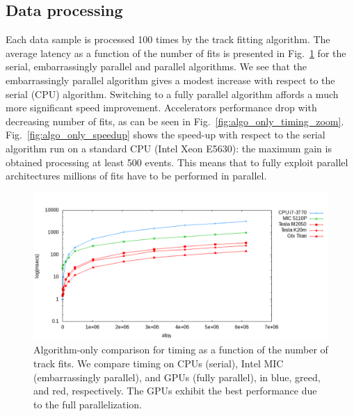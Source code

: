 \documentclass[a4]{jpconf}
\begin{document}
\subsection{Data processing}
Each data sample is processed 100 times by the track fitting algorithm. 
The average latency as a function of the number of fits is presented in 
Fig.~\ref{fig:algo_only_timing} for the serial,
embarrassingly parallel and parallel algorithms. We see that the
embarrassingly parallel algorithm gives a modest increase with respect
to the serial (CPU) algorithm. Switching to a fully parallel algorithm
affords a much more significant speed improvement. 
Accelerators performance drop with decreasing number of fits, as can be seen 
in Fig.~\ref{fig:algo_only_timing_zoom}.
Fig.~\ref{fig:algo_only_speedup} shows the speed-up with respect to the serial 
algorithm run on a standard CPU (Intel Xeon E5630): the maximum gain is 
obtained processing at least 500 events. This means that to fully exploit 
parallel architectures millions of fits have to be performed in parallel.  


%

 \begin{figure}[!tbp]
    \centering
    \includegraphics[width=0.9\linewidth]{figures/TimeComp_MIC}
    \caption{Algorithm-only comparison for timing as a function of the
      number of track fits. We compare timing on CPUs (serial), Intel
      MIC (embarrassingly parallel), and GPUs (fully parallel), in
      blue, greed, and red, respectively. The GPUs exhibit the best
      performance due to the full parallelization. }
    \label{fig:algo_only_timing}
  \end{figure}
 
\end{document}
